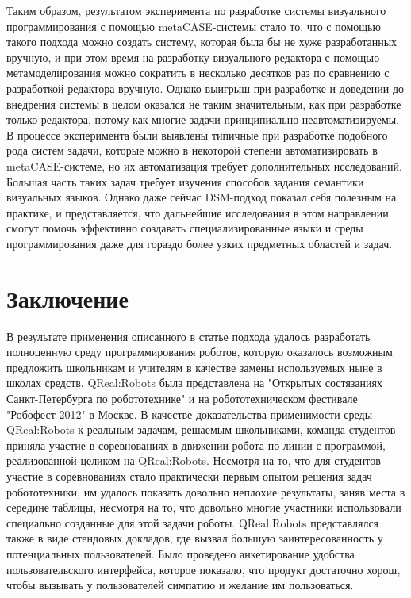 \documentclass[a4paper]{article}
\begin{document}
Таким образом, результатом эксперимента по разработке системы визуального программирования с помощью metaCASE-системы стало то, что с помощью такого подхода можно создать систему, которая была бы не хуже разработанных вручную, и при этом время на разработку визуального редактора с помощью метамоделирования можно сократить в несколько десятков раз по сравнению с разработкой редактора вручную. Однако выигрыш при разработке и доведении до внедрения системы в целом оказался не таким значительным, как при разработке только редактора, потому как многие задачи принципиально неавтоматизируемы. В процессе эксперимента были выявлены типичные при разработке подобного рода систем задачи, которые можно в некоторой степени автоматизировать в metaCASE-системе, но их автоматизация требует дополнительных исследований. Большая часть таких задач требует изучения способов задания семантики визуальных языков. Однако даже сейчас DSM-подход показал себя полезным на практике, и представляется, что дальнейшие исследования в этом направлении смогут помочь эффективно создавать специализированные языки и среды программирования даже для гораздо более узких предметных областей и задач.

\section*{Заключение}
В результате применения описанного в статье подхода удалось разработать полноценную среду программирования роботов, которую оказалось возможным предложить школьникам и учителям в качестве замены используемых ныне в школах средств. QReal:Robots была представлена на "Открытых состязаниях Санкт-Петербурга по робототехнике" и на робототехническом фестивале "Робофест 2012" в Москве. В качестве доказательства применимости среды QReal:Robots к реальным задачам, решаемым школьниками, команда студентов приняла участие в соревнованиях в движении робота по линии с программой, реализованной целиком на QReal:Robots. Несмотря на то, что для студентов участие в соревнованиях стало практически первым опытом решения задач робототехники, им удалось показать довольно неплохие результаты, заняв места в середине таблицы, несмотря на то, что довольно многие участники использовали специально созданные для этой задачи роботы. QReal:Robots представлялся также в виде стендовых докладов, где вызвал большую заинтересованность у потенциальных пользователей. Было проведено анкетирование удобства пользовательского интерфейса, которое показало, что продукт достаточно хорош, чтобы вызывать у пользователей симпатию и желание им пользоваться.
\end{document}
